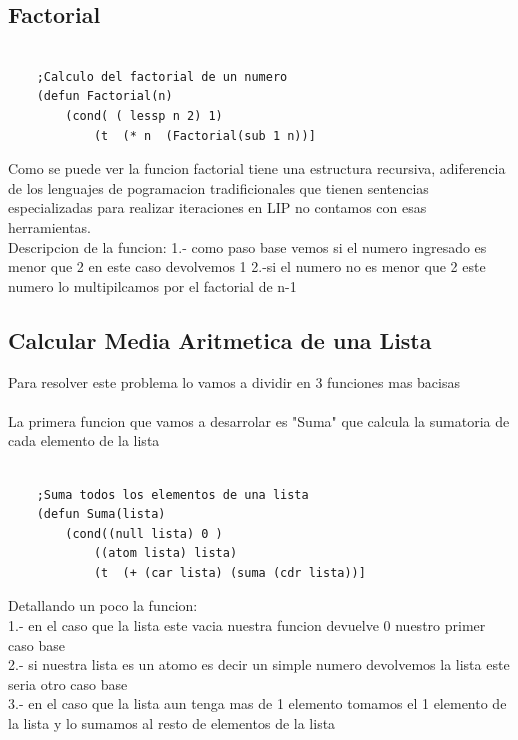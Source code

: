 \documentclass[11pt]{article} %
\begin{document}
\subsection{Factorial}

\lstset{language=LISP}          %

\begin{lstlisting}[frame=single]
	
	;Calculo del factorial de un numero
	(defun Factorial(n)
		(cond( ( lessp n 2) 1)
			(t  (* n  (Factorial(sub 1 n))] 
\end{lstlisting}

Como se puede ver la funcion factorial tiene una estructura recursiva, adiferencia de los lenguajes de pogramacion tradificionales que tienen sentencias especializadas para realizar iteraciones en LIP no contamos con esas herramientas.\\
Descripcion de la funcion:
1.- como paso base vemos si el numero ingresado es menor que 2 en este caso devolvemos 1
2.-si el numero no es menor que 2 este numero lo multipilcamos por el factorial de n-1 

\subsection{Calcular Media Aritmetica de una Lista}

Para resolver este problema lo vamos a dividir en 3 funciones mas bacisas
\\  \\
La primera funcion que vamos a desarrolar es "Suma" que calcula la sumatoria de cada elemento de la lista
\lstset{language=LISP}          %

\begin{lstlisting}[frame=single]
	
	;Suma todos los elementos de una lista
	(defun Suma(lista)
		(cond((null lista) 0 )
			((atom lista) lista)
			(t  (+ (car lista) (suma (cdr lista))] 
\end{lstlisting}

Detallando un poco la funcion:\\
1.- en el caso que la lista este vacia nuestra funcion devuelve 0 nuestro primer caso base\\
2.- si nuestra lista es un atomo es decir un simple numero devolvemos la lista este seria otro caso base\\
3.- en el caso que la lista aun tenga mas de 1 elemento tomamos el 1 elemento de la lista y lo sumamos al resto de elementos de la lista\\
\end{document}
